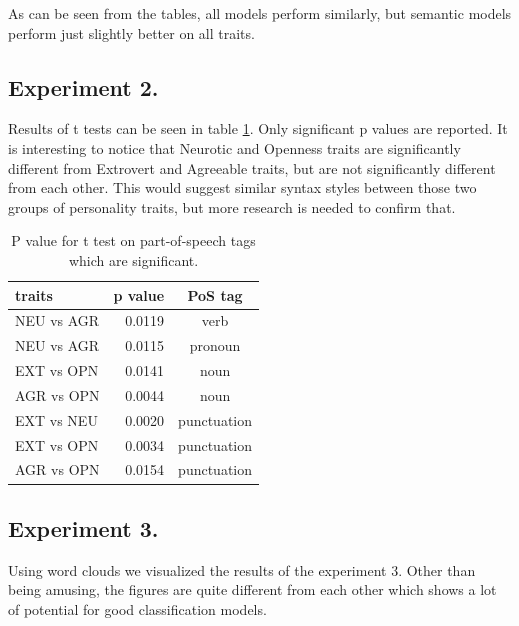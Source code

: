 \documentclass[10pt, a4paper]{article}
\begin{document}
As can be seen from the tables, all models perform similarly, but semantic models perform just slightly better on all traits.

\subsection{Experiment 2.}

Results of t tests can be seen in table \ref{table:ttest}.
Only significant p values are reported.
It is interesting to notice that Neurotic and Openness traits are significantly different from Extrovert and Agreeable traits, but are not significantly different from each other.
This would suggest similar syntax styles between those two groups of personality traits, but more research is needed to confirm that.

\begin{table}[H]
  \begin{tabular}{lrc}
    \toprule
    traits & p value & PoS tag \\
    \midrule
    NEU vs AGR & 0.0119 & verb \\
    NEU vs AGR & 0.0115 & pronoun \\
    EXT vs OPN & 0.0141 & noun \\
    AGR vs OPN & 0.0044 & noun \\
    EXT vs NEU & 0.0020 & punctuation \\
    EXT vs OPN & 0.0034 & punctuation \\
    AGR vs OPN & 0.0154 & punctuation \\
    \bottomrule
  \end{tabular}
  \caption{P value for t test on part-of-speech tags which are significant.}
  \label{table:ttest}
\end{table}

\subsection{Experiment 3.}

Using word clouds we visualized the results of the experiment 3.
Other than being amusing, the figures are quite different from each other which shows a lot of potential for good classification models.
\end{document}
